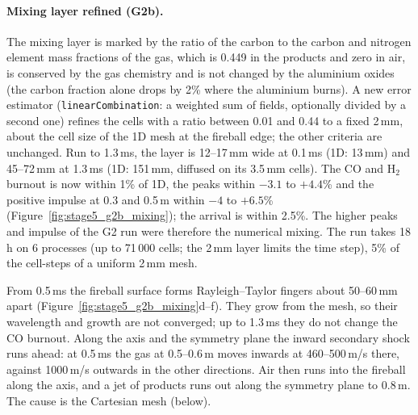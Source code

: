 \documentclass{article}
\begin{document}
\paragraph{Mixing layer refined (G2b).} The mixing layer is marked by the ratio of the carbon to the carbon and nitrogen element mass fractions of the gas, which is 0.449 in the products and zero in air, is conserved by the gas chemistry and is not changed by the aluminium oxides (the carbon fraction alone drops by 2\% where the aluminium burns). A new error estimator (\texttt{linearCombination}: a weighted sum of fields, optionally divided by a second one) refines the cells with a ratio between 0.01 and 0.44 to a fixed 2\,mm, about the cell size of the 1D mesh at the fireball edge; the other criteria are unchanged. Run to 1.3\,ms, the layer is 12--17\,mm wide at 0.1\,ms (1D: 13\,mm) and 45--72\,mm at 1.3\,ms (1D: 151\,mm, diffused on its 3.5\,mm cells). The CO and H$_2$ burnout is now within 1\% of 1D, the peaks within $-3.1$ to $+4.4$\% and the positive impulse at 0.3 and 0.5\,m within $-4$ to $+6.5$\% (Figure~\ref{fig:stage5_g2b_mixing}); the arrival is within 2.5\%. The higher peaks and impulse of the G2 run were therefore the numerical mixing. The run takes 18\,h on 6 processes (up to 71\,000 cells; the 2\,mm layer limits the time step), 5\% of the cell-steps of a uniform 2\,mm mesh.

From 0.5\,ms the fireball surface forms Rayleigh--Taylor fingers about 50--60\,mm apart (Figure~\ref{fig:stage5_g2b_mixing}d--f). They grow from the mesh, so their wavelength and growth are not converged; up to 1.3\,ms they do not change the CO burnout. Along the axis and the symmetry plane the inward secondary shock runs ahead: at 0.5\,ms the gas at 0.5--0.6\,m moves inwards at 460--500\,m/s there, against 1000\,m/s outwards in the other directions. Air then runs into the fireball along the axis, and a jet of products runs out along the symmetry plane to 0.8\,m. The cause is the Cartesian mesh (below).
\end{document}
